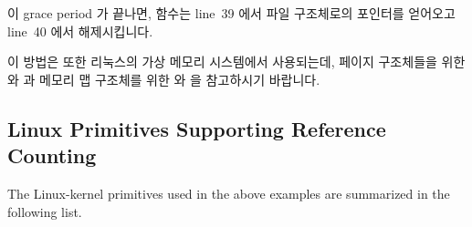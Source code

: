 이 grace period 가 끝나면,  함수는 line~39 에서 파일
구조체로의 포인터를 얻어오고 line~40 에서 해제시킵니다.

이 방법은 또한 리눅스의 가상 메모리 시스템에서 사용되는데, 페이지 구조체들을
위한  와  과 메모리 맵
구조체를 위한  와  을 참고하시기 바랍니다.
\iffalse

The \co{fput()} primitive releases a reference to a file structure.
Line~31 atomically decrements the reference count, and, if the result
was zero, line~32 invokes the \co{call_rcu()} primitives in order to
free up the file structure (via the \co{file_free_rcu()} function
specified in \co{call_rcu()}'s second argument),
but only after all currently-executing
RCU read-side critical sections complete.
The time period required for all currently-executing RCU read-side
critical sections to complete is termed a ``grace period''.
Note that the \co{atomic_dec_and_test()} primitive contains
a memory barrier.
This memory barrier is not necessary in this example, since the structure
cannot be destroyed until the RCU read-side critical section completes,
but in Linux, all atomic operations that return a result must
by definition contain memory barriers.

Once the grace period completes, the \co{file_free_rcu()} function
obtains a pointer to the file structure on line~39, and frees it
on line~40.

This approach is also used by Linux's virtual-memory system,
see \co{get_page_unless_zero()} and \co{put_page_testzero()} for
page structures as well as \co{try_to_unuse()} and \co{mmput()}
for memory-map structures.
\fi

\subsection{Linux Primitives Supporting Reference Counting}
\label{sec:defer:Linux Primitives Supporting Reference Counting}

The Linux-kernel primitives used in the above examples are
summarized in the following list.

